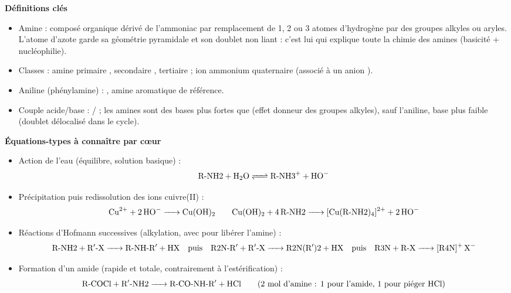 \documentclass[11pt]{article}
\newcommand{\cle}[1]{{\popxbold\color{popdark}#1}}
\begin{document}
\begin{bilan}
\textbf{D\'efinitions cl\'es}
\begin{itemize}
  \item \cle{Amine} : compos\'e organique d\'eriv\'e de l'ammoniac  par remplacement de 1, 2 ou 3 atomes d'hydrog\`ene par des groupes alkyles  ou aryles. L'atome d'azote garde sa g\'eom\'etrie \cle{pyramidale} et son \cle{doublet non liant} : c'est lui qui explique toute la chimie des amines (basicit\'e + nucl\'eophilie).
  \item \cle{Classes} : amine primaire , secondaire , tertiaire  ; \cle{ion ammonium quaternaire}  (associ\'e \`a un anion ).
  \item \cle{Aniline} (ph\'enylamine) : , amine aromatique de r\'ef\'erence.
  \item \cle{Couple acide/base} : / ; les amines sont des bases plus fortes que  (effet donneur des groupes alkyles), sauf l'aniline, base plus faible (doublet d\'elocalis\'e dans le cycle).
\end{itemize}

\textbf{\'Equations-types \`a conna\^itre par c\oe ur}
\begin{itemize}
  \item Action de l'eau (\'equilibre, solution basique) :
  \[ \ce{\text{R-NH2} + H2O <=> \text{R-NH3}+ + HO-} \]
  \item Pr\'ecipitation puis redissolution des ions cuivre(II) :
  \[ \ce{Cu^2+ + 2 HO- -> Cu(OH)2} \qquad \ce{Cu(OH)2 + 4 \text{R-NH2} -> [Cu(\text{R-NH2})4]^2+ + 2 HO-} \]
  \item R\'eactions d'Hofmann successives (alkylation, avec  pour lib\'erer l'amine) :
  \[ \ce{\text{R-NH2} + \text{R$'$-X} -> \text{R-NH-R$'$} + \text{HX}} \quad\text{puis}\quad \ce{\text{R2N-R$'$} + \text{R$'$-X} -> \text{R2N(R$'$)2} + \text{HX}} \quad\text{puis}\quad \ce{\text{R3N} + \text{R-X} -> [\text{R4N}]+ \text{X}-} \]
  \item Formation d'un amide (rapide et totale, contrairement \`a l'est\'erification) :
  \[ \ce{\text{R-COCl} + \text{R$'$-NH2} -> \text{R-CO-NH-R$'$} + HCl} \qquad\text{(2 mol d'amine : 1 pour l'amide, 1 pour pi\'eger \ce{HCl})} \]
\end{itemize}


\end{bilan}
\end{document}

